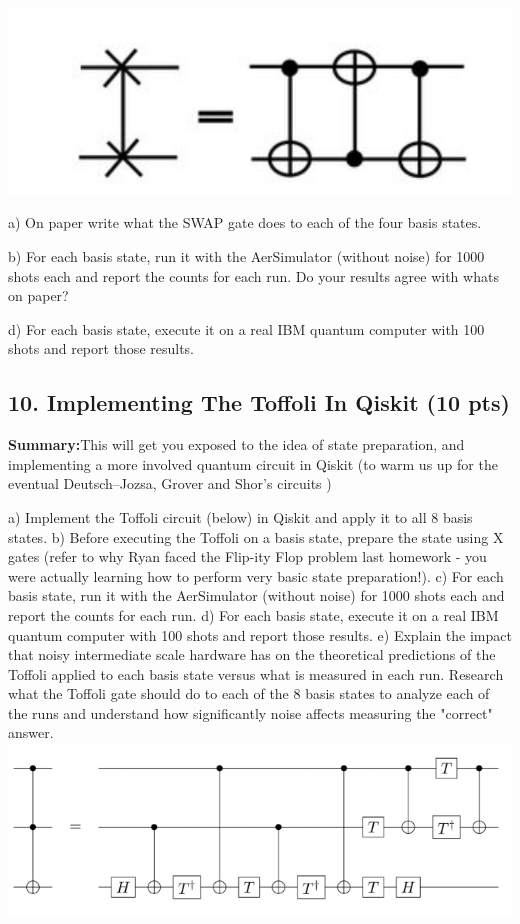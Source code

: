 \documentclass[12pt]{article}
\begin{document}
\includegraphics[scale=.5]{swap.png}

a) On paper write what the SWAP gate does to each of the four basis states.

b) For each basis state, run it with the AerSimulator (without noise) for 1000 shots each and report the counts for each run. Do your results agree with whats on paper?

d) For each basis state, execute it on a real IBM quantum computer with 100 shots and report those results.







\subsection*{10. Implementing The Toffoli In Qiskit (10 pts)}

\textbf{Summary:}This will get you exposed to the idea of state preparation, and implementing a more involved quantum circuit in Qiskit (to warm us up for the eventual Deutsch–Jozsa, Grover and Shor's circuits \smiley{})

a) Implement the Toffoli circuit (below) in Qiskit and apply it to all 8 basis states.
b) Before executing the Toffoli on a basis state, prepare the state using X gates (refer to why Ryan faced the Flip-ity Flop problem last homework \smiley{} - you were actually learning how to perform very basic state preparation!).
c) For each basis state, run it with the AerSimulator (without noise) for 1000 shots each and report the counts for each run.
d) For each basis state, execute it on a real IBM quantum computer with 100 shots and report those results.
e) Explain the impact that noisy intermediate scale hardware has on the theoretical predictions of the Toffoli applied to each basis state versus what is measured in each run. Research what the Toffoli gate should do to each of the 8 basis states to analyze each of the runs and understand how significantly noise affects measuring the "correct" answer.
\includegraphics[]{toff.png}
\end{document}
